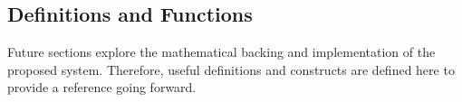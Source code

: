\subsection{Definitions and Functions}

Future sections explore the mathematical backing and implementation of the proposed system. Therefore, useful definitions and constructs are defined here to provide a reference going forward.

\newcommand{\viewpoint}{\ensuremath{v}}
\newcommand{\viewpointdomain}[0]{\ensuremath{V}}
\newcommand{\dmin}[0]{\ensuremath{d_{min}}}
\newcommand{\dmax}[0]{\ensuremath{d_{max}}}
\newcommand{\observation}[0]{\ensuremath{o}}
\newcommand{\observations}[1]{\ensuremath{\boldsymbol{O}^{#1}}}
\newcommand{\pe}[0]{\ensuremath{P(E)}}
\newcommand{\estpe}[0]{\ensuremath{\hat{P}(E)}}
\newcommand{\ps}[0]{\ensuremath{P(S,v)}}
\newcommand{\psge}[0]{\ensuremath{P(S,v|E)}}
\newcommand{\estpsge}[0]{\ensuremath{\hat{P}(S,v|E)}}
\newcommand{\psgne}[0]{\ensuremath{P(S,v|\lnot E)}}
\newcommand{\pegs}[0]{\ensuremath{P(E|S,v)}}
\newcommand{\pegns}[0]{\ensuremath{P(E|\lnot S,v)}}
\newcommand{\falsepos}[0]{\ensuremath{\varepsilon_{\text{pos}}}}
\newcommand{\falseneg}[0]{\ensuremath{\varepsilon_{\text{neg}}}}
\newcommand{\damping}[0]{\ensuremath{\alpha}}
\newcommand{\observability}[0]{\ensuremath{\rho}}
\newcommand{\observabilityupdate}[0]{\ensuremath{\eta}}
\newcommand{\state}[0]{\ensuremath{s}}
\newcommand{\feedback}[0]{\ensuremath{\beta}}
\newcommand{\params}[1]{\ensuremath{\boldsymbol{\theta}_{#1}}}
\newcommand{\param}[2]{\ensuremath{\theta_{#1,#2}}}
\newcommand{\epe}[0]{\ensuremath{\text{EPE}}}
\newcommand{\vbee}[0]{\ensuremath{\text{VBEE}}}
\newcommand{\knn}[0]{\ensuremath{\text{KNN}}}
\newcommand{\initialize}[1]{\ensuremath{\operatorname{Initialize}(#1)}}
\newcommand{\estimate}[1]{\ensuremath{\operatorname{Estimate}(#1)}}
\newcommand{\integrate}[1]{\ensuremath{\operatorname{Integrate}(#1)}}
\newcommand{\update}[1]{\ensuremath{\operatorname{Update}(#1)}}
\newcommand{\query}[0]{\ensuremath{\operatorname{Query}()}}
\newcommand{\athreshold}[0]{\ensuremath{\tau_{\text{angle}}}}
\newcommand{\feedbackthreshold}[0]{\ensuremath{\tau_{\text{\feedback}}}}
\newcommand{\existsthreshold}[0]{\ensuremath{\tau_{\text{E}}}}

